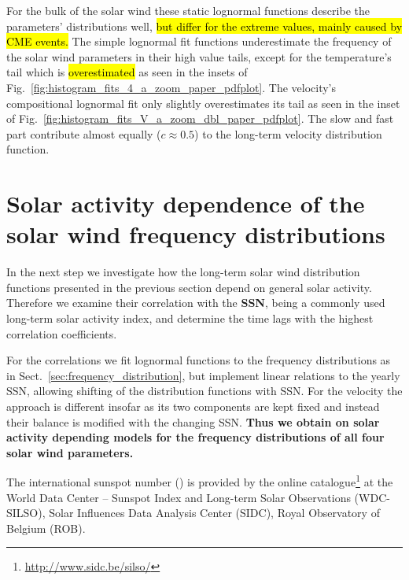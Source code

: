 For the bulk of the solar wind these static lognormal functions describe the parameters' distributions well, \hl{but differ for the extreme values, mainly caused by CME events. } 
The simple lognormal fit functions underestimate the frequency of the solar wind parameters in their high value tails, except for the temperature’s tail which is \hl{overestimated} as seen in the insets of Fig.~\ref{fig:histogram_fits_4_a_zoom_paper_pdfplot}. The velocity's compositional lognormal fit only slightly overestimates its tail as seen in the inset of Fig.~\ref{fig:histogram_fits_V_a_zoom_dbl_paper_pdfplot}.
The slow and fast part contribute almost equally ($c \approx 0.5$) to the long-term velocity distribution function.



\section{Solar activity dependence of the solar wind frequency distributions}
\label{sec:solar_activity_variations}
In the next step we investigate how the long-term solar wind distribution functions presented in the previous section depend on general solar activity. Therefore we examine their correlation with the \textbf{SSN}, being a commonly used long-term solar activity index, and determine the time lags with the highest correlation coefficients.

For the correlations we fit lognormal functions to the frequency distributions as in Sect.~\ref{sec:frequency_distribution}, but implement linear relations to the yearly SSN, allowing shifting of the distribution functions with SSN. For the velocity the approach is different insofar as its two components are kept fixed and instead their balance is modified with the changing SSN. \textbf{Thus we obtain on solar activity depending models for the frequency distributions of all four solar wind parameters.}

The international sunspot number (\citeyear{sidc}) is provided by the online catalogue\footnote{\url{http://www.sidc.be/silso/}} at the World Data Center -- Sunspot Index and Long-term Solar Observations (WDC-SILSO), Solar Influences Data Analysis Center (SIDC), Royal Observatory of Belgium (ROB).

